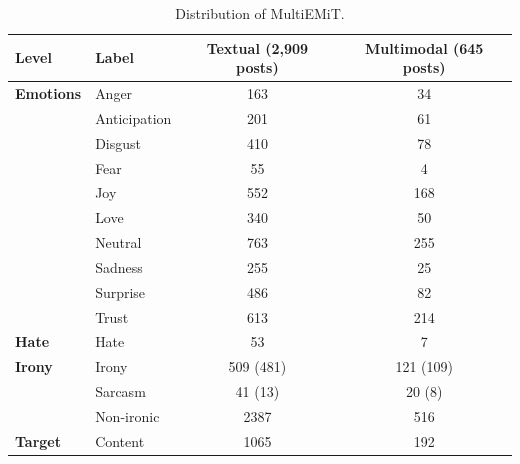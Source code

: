 \documentclass[letterpaper,journal]{IEEEtran}
\begin{document}
\begin{table}[!t]
\caption{Distribution of MultiEMiT.}
\label{table:2}
\centering
\begin{tabular}{llcc}
\textbf{Level}        & \textbf{Label} & \textbf{Textual (2,909 posts)} & \textbf{Multimodal (645 posts)} \\ \hline
\textbf{Emotions}     & Anger          & 163                            & 34                              \\
                      & Anticipation   & 201                            & 61                              \\
                      & Disgust        & 410                            & 78                              \\
                      & Fear           & 55                             & 4                               \\
                      & Joy            & 552                            & 168                             \\
                      & Love           & 340                            & 50                              \\
                      & Neutral        & 763                            & 255                             \\
                      & Sadness        & 255                            & 25                              \\
                      & Surprise       & 486                            & 82                              \\
                      & Trust          & 613                            & 214                             \\ \hline
\textbf{Hate}         & Hate           & 53                             & 7                               \\ \hline
\textbf{Irony}        & Irony          & 509 (481)                      & 121 (109)                       \\
                      & Sarcasm        & 41 (13)                        & 20 (8)                          \\
                      & Non-ironic       & 2387                           & 516                             \\ \hline
\textbf{Target}       & Content        & 1065                           & 192                             \\

\end{tabular}
\end{table}
\end{document}
